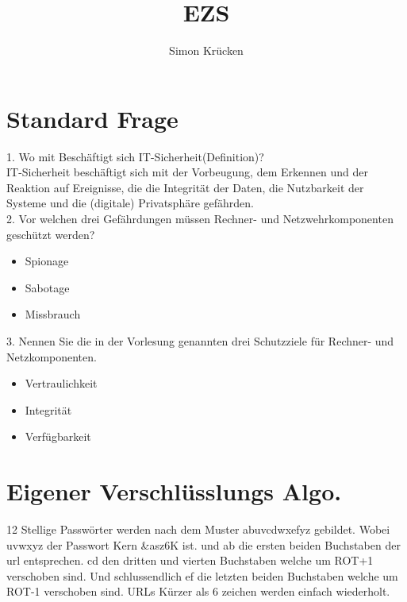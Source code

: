 \documentclass[12pt,a4paper,oneside,ngerman]{article}
\title{EZS}
\author{Simon Krücken}
\begin{document}
    
\begin{titlepage}
\end{titlepage}
\tableofcontents
\pagebreak



\section[Standard Fragen]{Standard Frage}

1. Wo mit Beschäftigt sich IT-Sicherheit(Definition)?\\
IT-Sicherheit beschäftigt sich mit der Vorbeugung, dem Erkennen und der Reaktion auf Ereignisse, die die Integrität der Daten, die Nutzbarkeit der Systeme und die (digitale) Privatsphäre gefährden.\\

2. Vor welchen drei Gefährdungen müssen Rechner- und Netzwehrkomponenten geschützt werden?\\
\begin{itemize}
	\item Spionage
	\item Sabotage
	\item Missbrauch
\end{itemize}

3. Nennen Sie die in der Vorlesung genannten drei Schutzziele für Rechner- und Netzkomponenten.\\
\begin{itemize}
	\item Vertraulichkeit
	\item Integrität
	\item Verfügbarkeit
\end{itemize}

\section{Eigener Verschlüsslungs Algo.}
12 Stellige Passwörter werden nach dem Muster abuvcdwxefyz gebildet.
Wobei uvwxyz der Passwort Kern \*\&asz6K\* ist. und \*ab\* die ersten beiden Buchstaben der url entsprechen.
\*cd\* den dritten und vierten Buchstaben welche um ROT+1 verschoben sind. Und schlussendlich \*ef\* die letzten beiden Buchstaben welche
um ROT-1 verschoben sind. URLs Kürzer als 6 zeichen werden einfach wiederholt.\\
\end{document}
